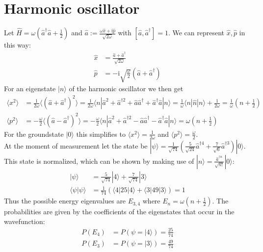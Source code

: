 \documentclass[english, parskip=full]{scrartcl}
\newcommand{\bra}{}
\newcommand{\brak}{}
\newcommand{\braket}{}
\newcommand{\kla}{}
\newcommand{\klam}{}
\newcommand{\Ket}{}
\def\I{\text{i}}
\begin{document}
\section{Harmonic oscillator}
Let $\hat{H}=\omega\kla\left( {\hat{a}^\dagger\hat{a} + \frac{1}{2}} \right)$ and $\hat{a}:=\frac{\omega \hat{x}+\I \hat{p}}{\sqrt{2\omega}}$ with $\klam\left[ {\hat{a},\hat{a}^\dagger} \right]=1$. We can represent $\hat{x},\hat{p}$ in this way:
\begin{align*}
\hat{x}&=\frac{\hat{a}+\hat{a}^\dagger}{\sqrt{2\omega}}\\
\hat{p}&=-\I\sqrt{\frac{\omega}{2}}\kla\left( {\hat{a}+\hat{a}^\dagger} \right)
\end{align*} 
For an eigenstate $\Ket | {n} \rangle$ of the harmonic oscillator we then get
\begin{align*}
\bra\langle {x^2}\rangle&=\frac{1}{2\omega}\bra\langle {\kla\left( {\hat{a}+\hat{a}^\dagger} \right)^2}\rangle=\frac{1}{2\omega}\braket\langle {n} | {\hat{a}^2+\hat{a}^{\dagger 2}+\hat{a}\hat{a}^\dagger + \hat{a}^\dagger\hat{a}} | {n}\rangle=\frac{1}{\omega}\braket\langle {n} | {\hat{n}} | {n}\rangle+\frac{1}{2\omega}=\frac{1}{\omega}\kla\left( {n+\frac{1}{2}} \right)\\
\bra\langle {p^2}\rangle&=-\frac{\omega}{2}\bra\langle {\kla\left( {\hat{a}-\hat{a}^\dagger} \right)^2}\rangle=-\frac{\omega}{2}\braket\langle {n} | {\hat{a}^2+\hat{a}^{\dagger 2}-\hat{a}\hat{a}^\dagger-\hat{a}^\dagger\hat{a}} | {n}\rangle=\omega\kla\left( {n+\frac{1}{2}} \right)
\end{align*}
For the groundstate $\Ket | {0} \rangle$ this simplifies to $\bra\langle {x^2}\rangle=\frac{1}{2\omega}$ and $\bra\langle {p^2}\rangle=\frac{\omega}{2}$.\\
At the moment of measurement let the state be $\Ket | {\psi} \rangle=\frac{1}{\sqrt{74}}\kla\left( {\frac{5}{\sqrt{24}}\hat{a}^{\dagger 4}+\frac{7}{\sqrt{6}}\hat{a}^{\dagger 3}} \right)\Ket | {0} \rangle$. This state is normalized, which can be shown by making use of $\Ket | {n} \rangle=\frac{\hat{a}^{\dagger n}}{\sqrt{n!}}\Ket | {0} \rangle$:
\begin{align*}
\Ket | {\psi} \rangle&=\frac{5}{\sqrt{74}}\Ket | {4} \rangle+\frac{7}{\sqrt{74}}\Ket | {3} \rangle\\
\brak\langle {\psi}| {\psi}\rangle&=\frac{1}{74}\kla\left( {\braket\langle {4} | {25} | {4}\rangle+\braket\langle {3} | {49} | {3}\rangle} \right)=1
\end{align*} 
Thus the possible energy eigenvalues are $E_{3,4}$ where $E_n=\omega\kla\left( {n+\frac{1}{2}} \right)$. The probabilities are given by the coefficients of the eigenstates that occur in the wavefunction:
\begin{align*}
P(E_4)&=P(\psi=\Ket | {4} \rangle)=\frac{25}{74}\\
P(E_3)&=P(\psi=\Ket | {3} \rangle)=\frac{49}{74}
\end{align*}
\end{document}
